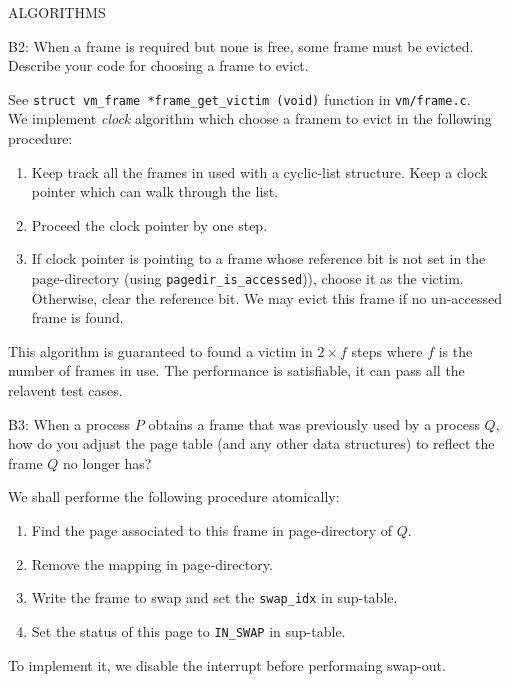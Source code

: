 \begin{aspect}{ALGORITHMS}
	\begin{qc}
		B2: When a frame is required but none is free, some frame must be
		evicted.
		Describe your code for choosing a frame to evict.
	\end{qc}
	See \lstinline{struct vm_frame *frame_get_victim (void)} function in \lstinline{vm/frame.c}.\\
	We implement \emph{clock} algorithm which choose a framem to evict in the following procedure:
	\begin{enumerate}
		\item Keep track all the frames in used with a cyclic-list structure.
		      Keep a clock pointer which can walk through the list.
		\item Proceed the clock pointer by one step.
		\item If clock pointer is pointing to a frame whose reference bit is not set in the page-directory (using \lstinline{pagedir_is_accessed})),
		      choose it as the victim.\\
		      Otherwise, clear the reference bit. We may evict this frame if no un-accessed frame is found.
	\end{enumerate}
	This algorithm is guaranteed to found a victim in $2\times f$ steps where $f$ is the number of frames in use.
	The performance is satisfiable, it can pass all the relavent test cases.

	\begin{qc}
		B3: When a process $P$ obtains a frame that was previously used by a process $Q$,
		how do you adjust the page table (and any other data structures) to reflect the frame $Q$ no longer has?
	\end{qc}
	We shall performe the following procedure atomically:
	\begin{enumerate}
		\item Find the page associated to this frame in page-directory of $Q$.
		\item Remove the mapping in page-directory.
		\item Write the frame to swap and set the \lstinline{swap_idx} in sup-table.
		\item Set the status of this page to \lstinline{IN_SWAP} in sup-table.
	\end{enumerate}
	To implement it, we disable the interrupt before performaing swap-out.


\end{aspect}
